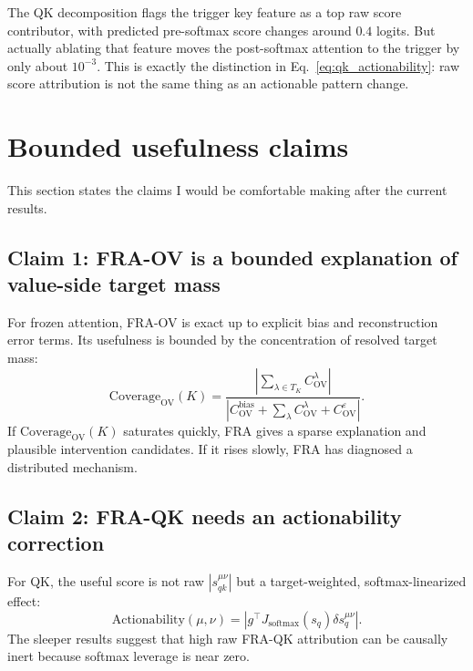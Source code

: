 \documentclass[11pt]{article}
\newcommand{\softmax}{\operatorname{softmax}}
\newcommand{\OV}{\mathrm{OV}}
\theoremstyle{definition}
\theoremstyle{plain}
\theoremstyle{remark}
\begin{document}
The QK decomposition flags the trigger key feature as a top raw score contributor,
with predicted pre-softmax score changes around $0.4$ logits.  But actually
ablating that feature moves the post-softmax attention to the trigger by only
about $10^{-3}$.  This is exactly the distinction in Eq.~\eqref{eq:qk_actionability}:
raw score attribution is not the same thing as an actionable pattern change.

\section{Bounded usefulness claims}

This section states the claims I would be comfortable making after the current
results.

\subsection{Claim 1: FRA-OV is a bounded explanation of value-side target mass}

For frozen attention, FRA-OV is exact up to explicit bias and reconstruction
error terms.  Its usefulness is bounded by the concentration of resolved target
mass:
\begin{equation}
    \mathrm{Coverage}_{\OV}(K)
    =
    \frac{\left|\sum_{\lambda\in T_K} C^\lambda_{\OV}\right|}
    {\left|C^{\mathrm{bias}}_{\OV}+\sum_\lambda C^\lambda_{\OV}+C^\varepsilon_{\OV}\right|}.
\end{equation}
If $\mathrm{Coverage}_{\OV}(K)$ saturates quickly, FRA gives a sparse explanation
and plausible intervention candidates.  If it rises slowly, FRA has diagnosed a
distributed mechanism.

\subsection{Claim 2: FRA-QK needs an actionability correction}

For QK, the useful score is not raw $|s_{qk}^{\mu\nu}|$ but a target-weighted,
softmax-linearized effect:
\begin{equation}
    \mathrm{Actionability}(\mu,\nu)
    =
    \left|g^\top J_{\softmax}(s_q)\delta s_q^{\mu\nu}\right|.
\end{equation}
The sleeper results suggest that high raw FRA-QK attribution can be causally
inert because softmax leverage is near zero.
\end{document}
